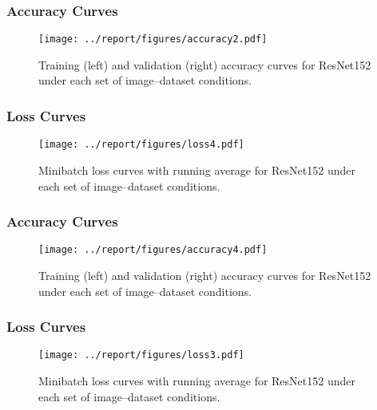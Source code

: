 \documentclass[11pt]{beamer}
\begin{document}
\begin{frame}
	\frametitle{Accuracy Curves}%

	\vspace{-0.5cm}
	\begin{figure}[h]
	\begin{center}
	\texttt{[image: ../report/figures/accuracy2.pdf]}
	\end{center}
	\caption[caption]{Training (left) and validation (right) accuracy curves for ResNet152 under each set of image--dataset conditions.}
	\label{fig:acc}
	\end{figure}

\end{frame}


\begin{frame}
	\frametitle{Loss Curves}%

	\vspace{-0.75cm}
	\begin{figure}[btp]
	\begin{center}
	\texttt{[image: ../report/figures/loss4.pdf]}
	\end{center}
	\caption[caption]{Minibatch loss curves with running average for ResNet152 under each set of image--dataset conditions.}
	\label{fig:loss}
	\end{figure}

\end{frame}

\begin{frame}
	\frametitle{Accuracy Curves}%

	\vspace{-0.5cm}
	\begin{figure}[h]
	\begin{center}
	\texttt{[image: ../report/figures/accuracy4.pdf]}
	\end{center}
	\caption[caption]{Training (left) and validation (right) accuracy curves for ResNet152 under each set of image--dataset conditions.}
	\label{fig:acc}
	\end{figure}

\end{frame}


\begin{frame}
	\frametitle{Loss Curves}%

	\vspace{-0.75cm}
	\begin{figure}[btp]
	\begin{center}
	\texttt{[image: ../report/figures/loss3.pdf]}
	\end{center}
	\caption[caption]{Minibatch loss curves with running average for ResNet152 under each set of image--dataset conditions.}
	\label{fig:loss}
	\end{figure}

\end{frame}
\end{document}
